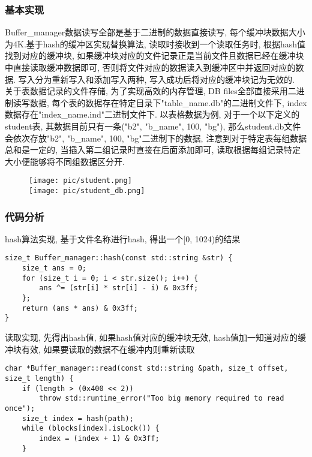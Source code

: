 \documentclass[10pt]{article}
\begin{document}
\begin{CJK}{UTF8}{gkai}
	\subsubsection{基本实现}
	Buffer\_manager数据读写全部是基于二进制的数据直接读写, 每个缓冲块数据大小为4K.基于hash的缓冲区实现替换算法, 读取时接收到一个读取任务时, 根据hash值找到对应的缓冲块, 如果缓冲块对应的文件记录正是当前文件且数据已经在缓冲块中直接读取缓冲数据即可, 否则将文件对应的数据读入到缓冲区中并返回对应的数据. 写入分为重新写入和添加写入两种, 写入成功后将对应的缓冲块记为无效的. 
	\\
	关于表数据记录的文件存储, 为了实现高效的内存管理, DB files全部直接采用二进制读写数据, 每个表的数据存在特定目录下"table\_name.db"的二进制文件下, index数据存在"index\_name.ind"二进制文件下. 以表格数据为例, 对于一个以下定义的student表, 其数据目前只有一条("b2", "b\_name", 100, "bg"), 那么student.db文件会依次存放"b2", "b\_name", 100, "bg"二进制下的数据, 注意到对于特定表每组数据总和是一定的, 当插入第二组记录时直接在后面添加即可, 读取根据每组记录特定大小便能够将不同组数据区分开.
		\begin{figure}[H]
			\texttt{[image: pic/student.png]} \\ 
			\texttt{[image: pic/student\_db.png]}
		\end{figure}
	
	\subsubsection{代码分析}
hash算法实现, 基于文件名称进行hash, 得出一个[0, 1024)的结果
\begin{lstlisting}
size_t Buffer_manager::hash(const std::string &str) {
    size_t ans = 0;
    for (size_t i = 0; i < str.size(); i++) {
        ans ^= (str[i] * str[i] - i) & 0x3ff;
    };
    return (ans * ans) & 0x3ff;
}
\end{lstlisting}
读取实现, 先得出hash值, 如果hash值对应的缓冲块无效, hash值加一知道对应的缓冲块有效, 如果要读取的数据不在缓冲内则重新读取
\begin{lstlisting}
char *Buffer_manager::read(const std::string &path, size_t offset, size_t length) {
    if (length > (0x400 << 2))
        throw std::runtime_error("Too big memory required to read once");
    size_t index = hash(path);
    while (blocks[index].isLock()) {
        index = (index + 1) & 0x3ff;
    }


\end{lstlisting}
\end{CJK}
\end{document}
